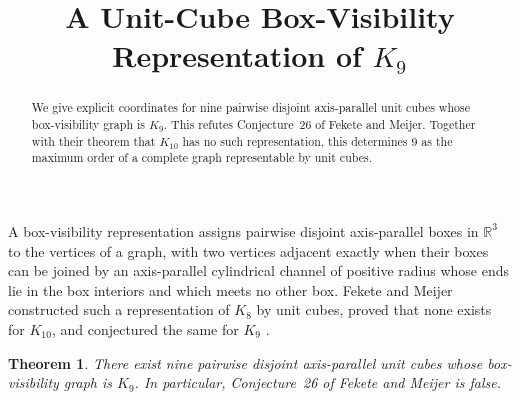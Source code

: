 \documentclass[11pt]{amsart}
\title[A unit-cube representation of $K_9$]
{A Unit-Cube Box-Visibility Representation of $K_9$}
\date{}
\newtheorem{theorem}{Theorem}
\begin{document}
\begin{abstract}
We give explicit coordinates for nine pairwise disjoint axis-parallel
unit cubes whose box-visibility graph is $K_9$. This refutes
Conjecture~26 of Fekete and Meijer. Together with their theorem that
$K_{10}$ has no such representation, this determines $9$ as the
maximum order of a complete graph representable by unit cubes.
\end{abstract}

\maketitle

A box-visibility representation assigns pairwise disjoint
axis-parallel boxes in $\mathbb R^3$ to the vertices of a graph, with
two vertices adjacent exactly when their boxes can be joined by an
axis-parallel cylindrical channel of positive radius whose ends lie
in the box interiors and which meets no other box. Fekete and Meijer
constructed such a representation of $K_8$ by unit cubes, proved that
none exists for $K_{10}$, and conjectured the same for $K_9$
\cite[Fig.~5, Theorem~25, and Conjecture~26]{FM}.

\begin{theorem}\label{thm:main}
There exist nine pairwise disjoint axis-parallel unit cubes whose
box-visibility graph is $K_9$. In particular, Conjecture~26 of Fekete
and Meijer is false.
\end{theorem}
\end{document}
